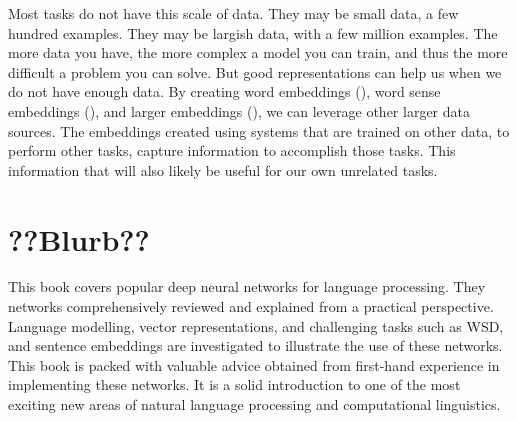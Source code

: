 \documentclass[12pt,parskip]{komatufte}
\begin{document}
Most tasks do not have this scale of data.
They may be small data, a few hundred examples.
They may be largish data, with a few million examples.
The more data you have, the more complex a model you can train,
and thus the more difficult a problem you can solve.
But good representations can help us when we do not have enough data.
By creating word embeddings (),
word sense embeddings (),
and larger embeddings (),
we can leverage other larger data sources.
The embeddings created using systems that are trained on other data, to perform other tasks,
capture information to accomplish those tasks.
This information that will also likely be useful for our own unrelated tasks.




\section{??Blurb??}
This book covers popular deep neural networks for language processing.
They networks comprehensively reviewed and explained from a practical perspective.
Language modelling, vector representations, and challenging tasks such as WSD, and sentence embeddings are investigated to illustrate the use of these networks.
This book is packed with valuable advice obtained from first-hand experience in implementing these networks.
It is a solid introduction to one of the most exciting new areas of natural language processing and computational linguistics.
\end{document}
